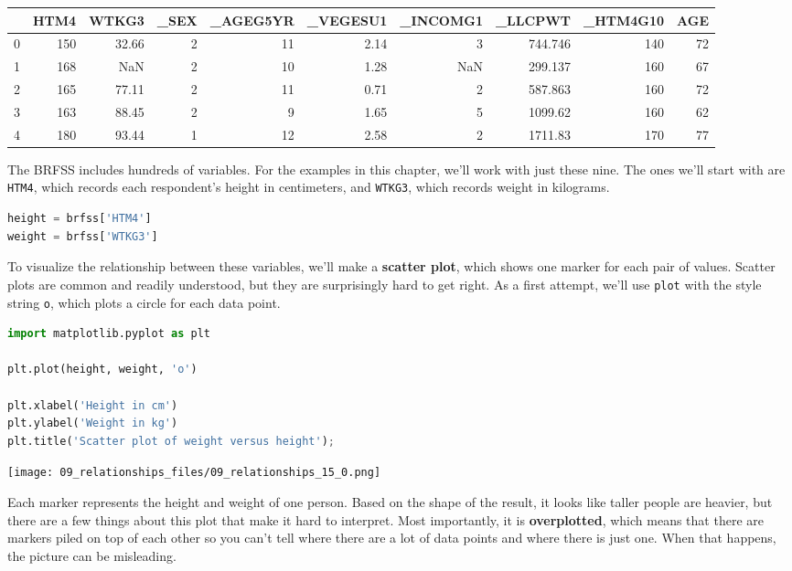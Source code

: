 \begin{tabular}{lrrrrrrrrr}
\toprule
 & HTM4 & WTKG3 & \_SEX & \_AGEG5YR & \_VEGESU1 & \_INCOMG1 & \_LLCPWT & \_HTM4G10 & AGE \\
\midrule
0 & 150 & 32.66 & 2 & 11 & 2.14 & 3 & 744.746 & 140 & 72 \\
1 & 168 & NaN & 2 & 10 & 1.28 & NaN & 299.137 & 160 & 67 \\
2 & 165 & 77.11 & 2 & 11 & 0.71 & 2 & 587.863 & 160 & 72 \\
3 & 163 & 88.45 & 2 & 9 & 1.65 & 5 & 1099.62 & 160 & 62 \\
4 & 180 & 93.44 & 1 & 12 & 2.58 & 2 & 1711.83 & 170 & 77 \\
\bottomrule
\end{tabular}

The BRFSS includes hundreds of variables. For the examples in this
chapter, we'll work with just these nine. The ones we'll start with are
\passthrough{\lstinline!HTM4!}, which records each respondent's height
in centimeters, and \passthrough{\lstinline!WTKG3!}, which records
weight in kilograms.

\begin{lstlisting}[language=Python,style=source]
height = brfss['HTM4']
weight = brfss['WTKG3']
\end{lstlisting}

To visualize the relationship between these variables, we'll make a
\textbf{scatter plot}, which shows one marker for each pair of values.
Scatter plots are common and readily understood, but they are
surprisingly hard to get right. As a first attempt, we'll use
\passthrough{\lstinline!plot!} with the style string
\passthrough{\lstinline!o!}, which plots a circle for each data point.

\begin{lstlisting}[language=Python,style=source]
import matplotlib.pyplot as plt

plt.plot(height, weight, 'o')

plt.xlabel('Height in cm')
plt.ylabel('Weight in kg')
plt.title('Scatter plot of weight versus height');
\end{lstlisting}

\begin{center}
\texttt{[image: 09\_relationships\_files/09\_relationships\_15\_0.png]}
\end{center}

Each marker represents the height and weight of one person. Based on the
shape of the result, it looks like taller people are heavier, but there
are a few things about this plot that make it hard to interpret. Most
importantly, it is \textbf{overplotted}, which means that there are
markers piled on top of each other so you can't tell where there are a
lot of data points and where there is just one. When that happens, the
picture can be misleading.

